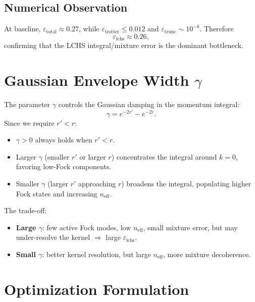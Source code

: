 \documentclass[11pt]{article}
\newcommand{\eps}{\varepsilon}
\begin{document}
\subsection{Numerical Observation}
At baseline, $\eps_{\mathrm{total}}\approx 0.27$, while $\eps_{\mathrm{trotter}}\leq 0.012$
and $\eps_{\mathrm{trunc}}\sim 10^{-8}$.  Therefore
\begin{equation}
\eps_{\mathrm{lchs}} \approx 0.26,
\end{equation}
confirming that the LCHS integral/mixture error is the dominant bottleneck.

\section{Gaussian Envelope Width $\gamma$}

The parameter $\gamma$ controls the Gaussian damping in the momentum integral:
\begin{equation}
\gamma = e^{-2r'} - e^{-2r}.
\end{equation}
Since we require $r' < r$:
\begin{itemize}
\item $\gamma > 0$ always holds when $r' < r$.
\item Larger $\gamma$ (smaller $r'$ or larger $r$) concentrates the integral
  around $k=0$, favoring low-Fock components.
\item Smaller $\gamma$ (larger $r'$ approaching $r$) broadens the integral,
  populating higher Fock states and increasing $n_{\mathrm{eff}}$.
\end{itemize}

The trade-off:
\begin{itemize}
\item \textbf{Large $\gamma$}: few active Fock modes, low $n_{\mathrm{eff}}$,
  small mixture error, but may under-resolve the kernel $\Rightarrow$ large $\eps_{\mathrm{lchs}}$.
\item \textbf{Small $\gamma$}: better kernel resolution, but large $n_{\mathrm{eff}}$,
  more mixture decoherence.
\end{itemize}

\section{Optimization Formulation}
\end{document}

